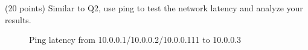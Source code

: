 \begin{exercise}[]{(20 points) Similar to Q2, use ping to test the network latency and analyze your results.}
\begin{solution}
\begin{figure}[ht]
\begin{center}
\begin{minipage}[t]{0.45\linewidth}
        \end{minipage}
        \caption{Ping latency from 10.0.0.1/10.0.0.2/10.0.0.111 to 10.0.0.3
        \label{fig:ex3-2}}
        \end{center}
    \end{figure}
  \end{solution}
  \label{ex3}
\end{exercise}